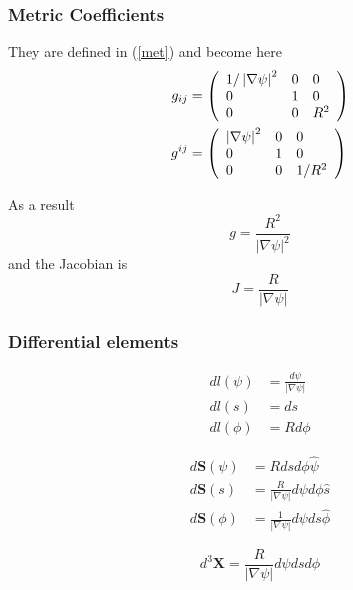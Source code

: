 \subsubsection{Metric Coefficients}

They are defined in (\ref{met}) and become here 
\begin{align}
g_{ij} & =\left( 
\begin{array}{lll}
1/\left| \nabla\psi\right| ^{2} & 0 & 0 \\ 
0 & 1 & 0 \\ 
0 & 0 & R^{2}%
\end{array}
\right) \\
g^{ij} & =\left( 
\begin{array}{lll}
\left| \nabla\psi\right| ^{2} & 0 & 0 \\ 
0 & 1 & 0 \\ 
0 & 0 & 1/R^{2}%
\end{array}
\right)  \notag
\end{align}

As a result 
\begin{equation}
g=\frac{R^{2}}{\left| \nabla\psi\right| ^{2}}
\end{equation}
and the Jacobian is 
\begin{equation}
J=\frac{R}{\left| \nabla\psi\right| }  \label{jacpsis}
\end{equation}

\subsubsection{Differential elements}

\begin{align}
dl\left( \psi\right) & =\frac{d\psi}{\left| \nabla\psi\right| } \\
dl\left( s\right) & =ds \\
dl\left( \phi\right) & =Rd\phi
\end{align}

\begin{align}
d\mathbf{S}\left( \psi\right) & =Rdsd\phi\widehat{\psi} \\
d\mathbf{S}\left( s\right) & =\frac{R}{\left| \nabla\psi\right| }d\psi d\phi%
\widehat{s} \\
d\mathbf{S}\left( \phi\right) & =\frac{1}{\left| \nabla\psi\right| }d\psi ds%
\widehat{\phi}
\end{align}

\begin{equation}
d^{3}\mathbf{X}=\frac{R}{\left| \nabla\psi\right| }d\psi dsd\phi
\end{equation}

